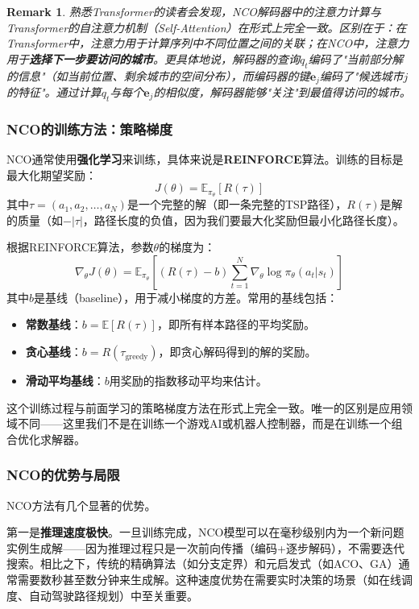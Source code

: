 \documentclass[lang=cn,zihao=-4,a4paper,fontset=windows]{beautybook}
\newtheorem*{remark}{\textbf{Remark}}
\begin{document}
\begin{remark}
熟悉Transformer的读者会发现，NCO解码器中的注意力计算与Transformer的自注意力机制（Self-Attention）在形式上完全一致。区别在于：在Transformer中，注意力用于计算序列中不同位置之间的关联；在NCO中，注意力用于\textbf{选择下一步要访问的城市}。更具体地说，解码器的查询$q_t$编码了"当前部分解的信息"（如当前位置、剩余城市的空间分布），而编码器的键$\mathbf{e}_j$编码了"候选城市$j$的特征"。通过计算$q_t$与每个$\mathbf{e}_j$的相似度，解码器能够"关注"到最值得访问的城市。
\end{remark}

\subsubsection{NCO的训练方法：策略梯度}

NCO通常使用\textbf{强化学习}来训练，具体来说是\textbf{REINFORCE}算法。训练的目标是最大化期望奖励：
\[
J(\theta) = \mathbb{E}_{\pi_\theta}[R(\tau)]
\]
其中$\tau = (a_1, a_2, \dots, a_N)$是一个完整的解（即一条完整的TSP路径），$R(\tau)$是解的质量（如$-|\tau|$，路径长度的负值，因为我们要最大化奖励但最小化路径长度）。

根据REINFORCE算法，参数$\theta$的梯度为：
\[
\nabla_\theta J(\theta) = \mathbb{E}_{\pi_\theta}\left[ \left(R(\tau) - b\right) \sum_{t=1}^{N} \nabla_\theta \log \pi_\theta(a_t | s_t) \right]
\]
其中$b$是基线（baseline），用于减小梯度的方差。常用的基线包括：
\begin{itemize}
    \item \textbf{常数基线}：$b = \mathbb{E}[R(\tau)]$，即所有样本路径的平均奖励。
    \item \textbf{贪心基线}：$b = R(\tau_{\text{greedy}})$，即贪心解码得到的解的奖励。
    \item \textbf{滑动平均基线}：$b$用奖励的指数移动平均来估计。
\end{itemize}

这个训练过程与前面学习的策略梯度方法在形式上完全一致。唯一的区别是应用领域不同——这里我们不是在训练一个游戏AI或机器人控制器，而是在训练一个组合优化求解器。

\subsubsection{NCO的优势与局限}

NCO方法有几个显著的优势。

第一是\textbf{推理速度极快}。一旦训练完成，NCO模型可以在毫秒级别内为一个新问题实例生成解——因为推理过程只是一次前向传播（编码+逐步解码），不需要迭代搜索。相比之下，传统的精确算法（如分支定界）和元启发式（如ACO、GA）通常需要数秒甚至数分钟来生成解。这种速度优势在需要实时决策的场景（如在线调度、自动驾驶路径规划）中至关重要。
\end{document}
